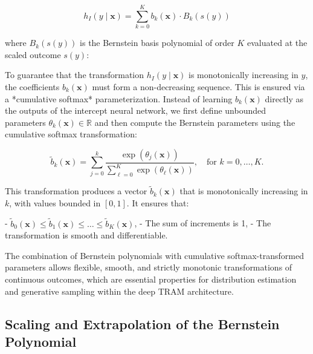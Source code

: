 \begin{equation}
h_I(y \mid \mathbf{x}) = \sum_{k=0}^{K} b_k(\mathbf{x}) \cdot B_k(s(y))
\label{eq:bernstein_intercept}
\end{equation}

where \( B_k(s(y)) \) is the Bernstein basis polynomial of order \( K \) evaluated at the scaled outcome \( s(y) \):


To guarantee that the transformation \( h_I(y \mid \mathbf{x}) \) is monotonically increasing in \( y \), the coefficients \( b_k(\mathbf{x}) \) must form a non-decreasing sequence. This is ensured via a *cumulative softmax* parameterization. Instead of learning \( b_k(\mathbf{x}) \) directly as the outputs of the intercept neural network, we first define unbounded parameters \( \theta_k(\mathbf{x}) \in \mathbb{R} \) and then compute the Bernstein parameters using the cumulative softmax transformation:

\begin{equation}
\tilde{b}_k(\mathbf{x}) = \sum_{j=0}^{k} \frac{\exp(\theta_j(\mathbf{x}))}{\sum_{\ell=0}^{K} \exp(\theta_\ell(\mathbf{x}))}, \quad \text{for } k = 0, \ldots, K.
\end{equation}

This transformation produces a vector \( \tilde{b}_k(\mathbf{x}) \) that is monotonically increasing in \( k \), with values bounded in \( [0, 1] \). It ensures that:

- \( \tilde{b}_0(\mathbf{x}) \leq \tilde{b}_1(\mathbf{x}) \leq \ldots \leq \tilde{b}_K(\mathbf{x}) \),
- The sum of increments is 1,
- The transformation is smooth and differentiable.


The combination of Bernstein polynomials with cumulative softmax-transformed parameters allows flexible, smooth, and strictly monotonic transformations of continuous outcomes, which are essential properties for distribution estimation and generative sampling within the deep TRAM architecture.

\subsection{Scaling and Extrapolation of the Bernstein Polynomial}




